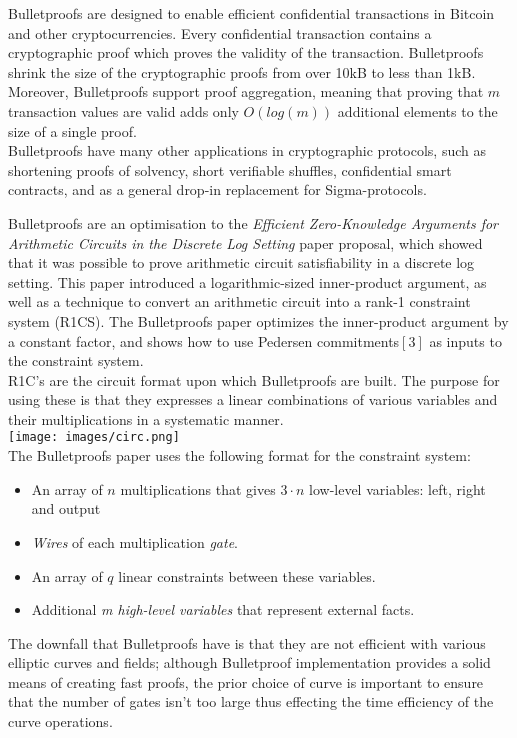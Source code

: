 \documentclass[letterpaper, 10 pt, conference]{ieeeconf}  %
\begin{document}
Bulletproofs are designed to enable efficient confidential transactions in Bitcoin and other cryptocurrencies. Every confidential transaction contains a cryptographic proof which proves the validity of the transaction. Bulletproofs shrink the size of the cryptographic proofs from over 10kB to less than 1kB. Moreover, Bulletproofs support proof aggregation, meaning that proving that $m$ transaction values are valid adds only $O(log(m))$ additional elements to the size of a single proof.\\

Bulletproofs have many other applications in cryptographic protocols, such as shortening proofs of solvency, short verifiable shuffles, confidential smart contracts, and as a general drop-in replacement for Sigma-protocols.

Bulletproofs are an optimisation to the \emph{Efficient Zero-Knowledge Arguments for
Arithmetic Circuits in the Discrete Log Setting} paper proposal, which showed that it was possible to prove arithmetic circuit satisfiability in a discrete log setting. This paper introduced a logarithmic-sized inner-product argument, as well as a technique to convert an arithmetic circuit into a rank-1 constraint system (R1CS). The Bulletproofs paper optimizes the inner-product argument by a constant factor, and shows how to use Pedersen commitments$[3]$ as inputs to the constraint system.\\
R1C's are the circuit format upon which Bulletproofs are built. The purpose for using these is that they expresses a linear combinations of various variables and their multiplications in a systematic manner.\\
\texttt{[image: images/circ.png]}\\ \newline
The Bulletproofs paper uses the following format for the constraint system: 
\begin{itemize}
    \item  An array of $n$ multiplications that gives $3 \cdot n$ low-level variables: left, right and output
    \item \emph{Wires} of each multiplication \emph{gate}.
    \item An array of $q$ linear constraints between these variables.
    \item Additional \emph{m high-level variables} that represent external facts.
\end{itemize} 
The downfall that Bulletproofs have is that they are not efficient with various elliptic curves and fields; although Bulletproof implementation provides a solid means of creating fast proofs, the prior choice of curve is important to ensure that the number of gates isn't too large thus effecting the time efficiency of the curve operations.  
\end{document}
